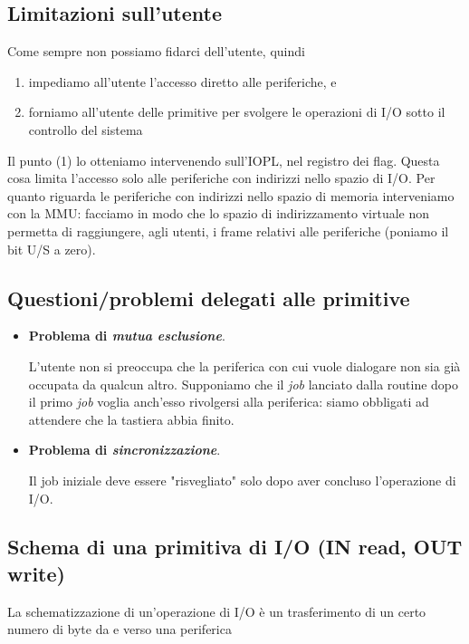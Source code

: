 \documentclass[11pt]{report}
\theoremstyle{definition}
\begin{document}
\subsection{Limitazioni sull'utente} Come sempre non possiamo fidarci dell'utente, quindi
\begin{enumerate}
	\item impediamo all'utente l'accesso diretto alle periferiche, e
	\item forniamo all'utente delle primitive per svolgere le operazioni di I/O sotto il controllo del sistema
\end{enumerate} 
Il punto (1) lo otteniamo intervenendo sull'IOPL, nel registro dei flag. Questa cosa limita l'accesso solo alle periferiche con indirizzi nello spazio di I/O. Per quanto riguarda le periferiche con indirizzi nello spazio di memoria interveniamo con la MMU: facciamo in modo che lo spazio di indirizzamento virtuale non permetta di raggiungere, agli utenti, i frame relativi alle periferiche (poniamo il bit U/S a zero). 

\subsection{Questioni/problemi delegati alle primitive}
\begin{itemize}
	\item \textbf{Problema di \emph{mutua esclusione}}.
	
	L'utente non si preoccupa che la periferica con cui vuole dialogare non sia già occupata da qualcun altro. Supponiamo che il \emph{job} lanciato dalla routine dopo il primo \emph{job} voglia anch'esso rivolgersi alla periferica: siamo obbligati ad attendere che la tastiera abbia finito. 
	
	\item \textbf{Problema di \emph{sincronizzazione}}.
	
	Il job iniziale deve essere "risvegliato" solo dopo aver concluso l'operazione di I/O. 
\end{itemize} 

\subsection{Schema di una primitiva di I/O (IN read, OUT write)} La schematizzazione di un'operazione di I/O è un trasferimento di un certo numero di byte da e verso una periferica
\end{document}
